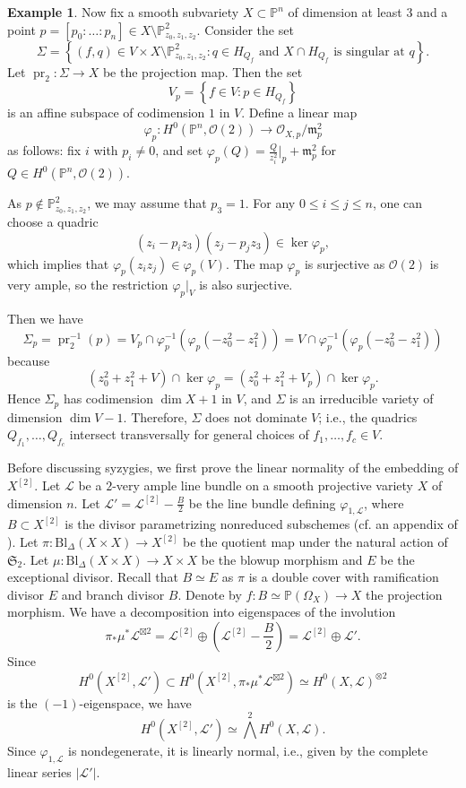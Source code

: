 \documentclass[a4paper]{amsart}
\numberwithin{equation}{section}
\theoremstyle{plain}
\theoremstyle{definition}
\newtheorem{exa}[thm]{Example}
\theoremstyle{remark}
\numberwithin{figure}{section}
\numberwithin{table}{section}
\numberwithin{equation}{section}
\def \PP {\mathbb{P}}
\def \Lcal {\mathcal{L}}
\def \Ocal {\mathcal{O}}
\def \Sfr {\mathfrak{S}}
\def \mfr {\mathfrak{m}}
\DeclareMathOperator{\pr}{pr}
\begin{document}
\begin{exa}
    Now fix a smooth subvariety $X \subset \PP^n$ of dimension at least $3$ and a point $p=[p_0: \dots : p_n] \in X \setminus \PP_{z_0,z_1,z_2}^2$.
    Consider the set
     \[
      \Sigma = \left\{ (f, q) \in V \times X \setminus \PP_{z_0,z_1,z_2}^2: q \in H_{Q_{f}} \text{ and } X \cap H_{Q_{f}} \text{ is singular at } q \right\}.
     \]
    Let $\pr_2:\Sigma \rightarrow X$ be the projection map.
    Then the set
     \[
      V_p = \left\{ f \in V: p \in H_{Q_f} \right\}
     \]
    is an affine subspace of codimension $1$ in $V$.
    Define a linear map
     \[
      \varphi_p:H^0(\PP^n, \Ocal(2)) \rightarrow \Ocal_{X,p}/\mfr_{p}^2
     \]
    as follows: fix $i$ with $p_i \neq 0$, and set $\varphi_p(Q) = \frac{Q}{z_i^2}\big|_{p} +\mfr_{p}^2$ for $Q \in H^0(\PP^n, \Ocal(2))$.
    
    As $p \not\in \PP_{z_0,z_1,z_2}^2$, we may assume that $p_3 = 1$.
    For any $0 \leq i \leq j \leq n$, one can choose a quadric
     \[
      (z_i - p_iz_3)(z_j - p_jz_3) \in \ker \varphi_p,
     \]
    which implies that $\varphi_p(z_iz_j) \in \varphi_p(V)$.
    The map $\varphi_p$ is surjective as $\Ocal(2)$ is very ample, so the restriction $\varphi_p|_V$ is also surjective.
    
    Then we have
     \[
      \Sigma_p = \pr_2^{-1}(p)
        = V_p \cap \varphi_p^{-1}(\varphi_p(-z_0^2-z_1^2))
        = V \cap \varphi_p^{-1}(\varphi_p(-z_0^2-z_1^2))
     \]
    because
     \[
      (z_0^2 + z_1^2 + V) \cap \ker\varphi_p = (z_0^2 + z_1^2 + V_p) \cap \ker\varphi_p.
     \]
    Hence $\Sigma_p$ has codimension $\dim X + 1$ in $V$, and $\Sigma$ is an irreducible variety of dimension $\dim V - 1$.
    Therefore, $\Sigma$ does not dominate $V$; i.e., the quadrics $Q_{f_1}, \dots, Q_{f_c}$ intersect transversally for general choices of $f_1, \dots, f_c \in V$.
\end{exa}

Before discussing syzygies, we first prove the linear normality of the embedding of $X^{[2]}$.
Let $\Lcal$ be a $2$-very ample line bundle on a smooth projective variety $X$ of dimension $n$.
Let $\Lcal' = \Lcal^{[2]} - \frac{B}{2}$ be the line bundle defining $\varphi_{1, \Lcal}$, where $B \subset X^{[2]}$ is the divisor parametrizing nonreduced subschemes (cf. an appendix of \cite{BS1991}).
Let $\pi:\mathrm{Bl}_{\Delta} (X \times X) \rightarrow X^{[2]}$ be the quotient map under the natural action of $\Sfr_2$.
Let $\mu:\mathrm{Bl}_{\Delta} (X \times X) \rightarrow X \times X$ be the blowup morphism and $E$ be the exceptional divisor.
Recall that $B \simeq E$ as $\pi$ is a double cover with ramification divisor $E$ and branch divisor $B$.
Denote by $f:B \simeq \PP(\Omega_X) \rightarrow X$ the projection morphism.
We have a decomposition into eigenspaces of the involution
 \[
  \pi_{\ast} \mu^{\ast} \Lcal^{\boxtimes 2} = \Lcal^{[2]} \oplus \left( \Lcal^{[2]} - \frac{B}{2} \right) = \Lcal^{[2]} \oplus \Lcal'.
 \]
Since
 \[
  H^0(X^{[2]}, \Lcal') \subset H^0(X^{[2]}, \pi_{\ast} \mu^{\ast} \Lcal^{\boxtimes 2}) \simeq H^0(X,\Lcal)^{\otimes 2}
 \]
is the $(-1)$-eigenspace, we have
 \[
  H^0(X^{[2]}, \Lcal') \simeq \bigwedge^2 H^0(X, \Lcal).
 \]
Since $\varphi_{1, \Lcal}$ is nondegenerate, it is linearly normal, i.e., given by the complete linear series $|\Lcal'|$.
\end{document}
